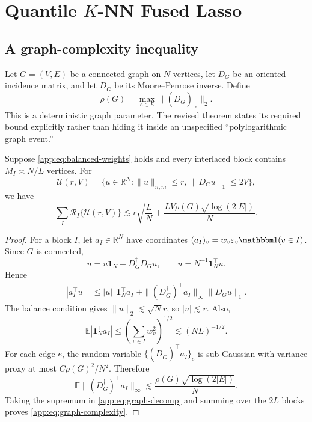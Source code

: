 \documentclass[twoside,11pt]{article}
\newenvironment{revision}{\color{revisionred}}{}
\begin{document}
\begin{revision}
\section{Quantile \texorpdfstring{$K$}{K}-NN Fused Lasso}
\label{app:knn}

\subsection{A graph-complexity inequality}

Let $G=(V,E)$ be a connected graph on $N$ vertices, let $D_G$ be an oriented
incidence matrix, and let $D_G^\dagger$ be its Moore--Penrose inverse.  Define
\begin{equation}
 \rho(G)=\max_{e\in E}\|(D_G^\dagger)_{\cdot e}\|_2.            \label{app:eq:rhoG}
\end{equation}
This is a deterministic graph parameter.  The revised theorem states its
required bound explicitly rather than hiding it inside an unspecified
``polylogarithmic graph event.''

\begin{proposition}
\label{app:prop:graph-complexity}
Suppose \eqref{app:eq:balanced-weights} holds and every interlaced block contains
$M_I\asymp N/L$ vertices.  For
\[
 \mathcal U(r,V)=\{u\in\mathbb R^N:\|u\|_{n,m}\le r,
 \ \|D_Gu\|_1\le2V\},
\]
we have
\begin{equation}
 \sum_I\mathcal R_I\{\mathcal U(r,V)\}
 \lesssim r\sqrt{\frac{L}{N}}
 +\frac{LV\rho(G)\sqrt{\log(2|E|)}}{N}.                         \label{app:eq:graph-complexity}
\end{equation}
\end{proposition}

\begin{proof}
For a block $I$, let $a_I\in\mathbb R^N$ have coordinates
$(a_I)_v=w_v\varepsilon_v\mathbbm 1(v\in I)$.  Since $G$ is connected,
\[
 u=\bar u\mathbf 1_N+D_G^\dagger D_Gu,
 \qquad \bar u=N^{-1}\mathbf 1_N^\top u.
\]
Hence
\begin{align}
 |a_I^\top u|
 &\le |\bar u|\,|\mathbf 1_N^\top a_I|
   +\|(D_G^\dagger)^\top a_I\|_\infty\|D_Gu\|_1.             \label{app:eq:graph-decomp}
\end{align}
The balance condition gives $\|u\|_2\lesssim\sqrt N r$, so
$|\bar u|\lesssim r$.  Also,
\[
 \mathbb E|\mathbf 1_N^\top a_I|
 \le\left(\sum_{v\in I}w_v^2\right)^{1/2}
 \lesssim (NL)^{-1/2}.
\]
For each edge $e$, the random variable
$\{(D_G^\dagger)^\top a_I\}_e$ is sub-Gaussian with variance proxy at most
$C\rho(G)^2/N^2$.  Therefore
\[
 \mathbb E\|(D_G^\dagger)^\top a_I\|_\infty
 \lesssim\frac{\rho(G)\sqrt{\log(2|E|)}}{N}.
\]
Taking the supremum in \eqref{app:eq:graph-decomp} and summing over the $2L$
blocks proves \eqref{app:eq:graph-complexity}.
\end{proof}


\end{revision}
\end{document}
